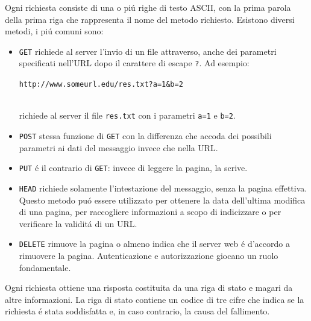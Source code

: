 \documentclass[12pt]{article}
\def\code#1{\texttt{#1}}
\begin{document}
Ogni richiesta consiste di una o pi\'u righe di testo ASCII, con la prima parola della prima riga che rappresenta il nome del 
metodo richiesto. Esistono diversi metodi, i pi\'u comuni sono:
\begin{itemize}
	\item \code{GET} richiede al server l'invio di un file attraverso, anche dei parametri specificati nell'URL dopo il carattere
	di escape \code{?}. Ad esempio:\\
		\centerline{\code{http://www.someurl.edu/res.txt?a=1\&b=2}}\\
	richiede al server il file \code{res.txt} con i parametri \code{a=1} e \code{b=2}.
	
	\item \code{POST} stessa funzione di \code{GET} con la differenza che accoda dei possibili parametri ai dati del messaggio 
	invece che nella URL.

	\item \code{PUT} \'e il contrario di \code{GET}: invece di leggere la pagina, la scrive.

	\item \code{HEAD} richiede solamente l'intestazione del messaggio, senza la pagina effettiva. Questo metodo pu\'o essere 
	utilizzato per ottenere la data dell'ultima modifica di una pagina, per raccogliere informazioni a scopo di indicizzare o per 
	verificare la validit\'a di un URL.

	\item \code{DELETE} rimuove la pagina o almeno indica che il server web \'e d'accordo a rimuovere la pagina. Autenticazione e 
	autorizzazione giocano un ruolo fondamentale.\\ %
\end{itemize}

Ogni richiesta ottiene una risposta costituita da una riga di stato e magari da altre informazioni. La riga di stato contiene un 
codice di tre cifre che indica se la richiesta \'e stata soddisfatta e, in caso contrario, la causa del fallimento.
\end{document}
